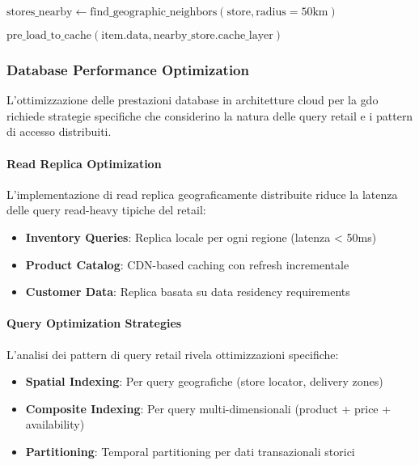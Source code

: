 \begin{algorithm}[H]
\begin{algorithmic}[1]
                \State $\text{stores\_nearby} \leftarrow \text{find\_geographic\_neighbors}(\text{store}, \text{radius}=50\text{km})$
                
                        \State $\text{pre\_load\_to\_cache}(\text{item.data}, \text{nearby\_store.cache\_layer})$
                    \EndIf
                \EndFor
            \EndIf
        \EndFor
    \EndFor
\EndFunction
\end{algorithmic}
\end{algorithm}

\subsubsection{Database Performance Optimization}

L'ottimizzazione delle prestazioni database in architetture cloud per la \gls{gdo} richiede strategie specifiche che considerino la natura delle query retail e i pattern di accesso distribuiti.

\paragraph{Read Replica Optimization}

L'implementazione di read replica geograficamente distribuite riduce la latenza delle query read-heavy tipiche del retail:

\begin{itemize}
    \item \textbf{Inventory Queries}: Replica locale per ogni regione (latenza < 50ms)
    \item \textbf{Product Catalog}: CDN-based caching con refresh incrementale
    \item \textbf{Customer Data}: Replica basata su data residency requirements
\end{itemize}

\paragraph{Query Optimization Strategies}

L'analisi dei pattern di query retail rivela ottimizzazioni specifiche:

\begin{itemize}
    \item \textbf{Spatial Indexing}: Per query geografiche (store locator, delivery zones)
    \item \textbf{Composite Indexing}: Per query multi-dimensionali (product + price + availability)
    \item \textbf{Partitioning}: Temporal partitioning per dati transazionali storici
\end{itemize}

